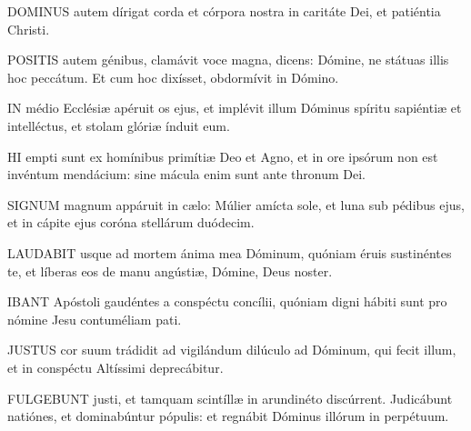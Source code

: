
\lettrine[lines=2]{D}{OMINUS} autem dírigat corda et córpora nostra in caritáte Dei, et patiéntia Christi.



\lettrine[lines=2]{P}{OSITIS} autem génibus, clamávit voce magna, dicens: Dómine, ne státuas illis hoc peccátum. Et cum hoc dixísset, obdormívit in Dómino.


\lettrine[lines=2]{I}{N} médio Ecclésiæ apéruit os ejus, et implévit illum Dóminus spíritu sapiéntiæ et intelléctus, et stolam glóriæ índuit eum.


\lettrine[lines=2]{H}{I} empti sunt ex homínibus primítiæ Deo et Agno, et in ore ipsórum non est invéntum mendácium: sine mácula enim sunt ante thronum Dei.



\lettrine[lines=2]{S}{IGNUM} magnum appáruit in cælo: Múlier amícta sole, et luna sub pédibus ejus, et in cápite ejus coróna stellárum duódecim.


\lettrine[lines=2]{L}{AUDABIT} usque ad mortem ánima mea Dóminum, quóniam éruis sustinéntes te, et líberas eos de manu angústiæ, Dómine, Deus noster.



\lettrine[lines=2]{I}{BANT} Apóstoli gaudéntes a conspéctu concílii, quóniam digni hábiti sunt pro nómine Jesu contuméliam pati.


\lettrine[lines=2]{J}{USTUS} cor suum trádidit ad vigilándum dilúculo ad Dóminum, qui fecit illum, et in conspéctu Altíssimi deprecábitur.


\lettrine[lines=2]{F}{ULGEBUNT} justi, et tamquam scintíllæ in arundinéto discúrrent. Judicábunt natiónes, et dominabúntur pópulis: et regnábit Dóminus illórum in perpétuum.

